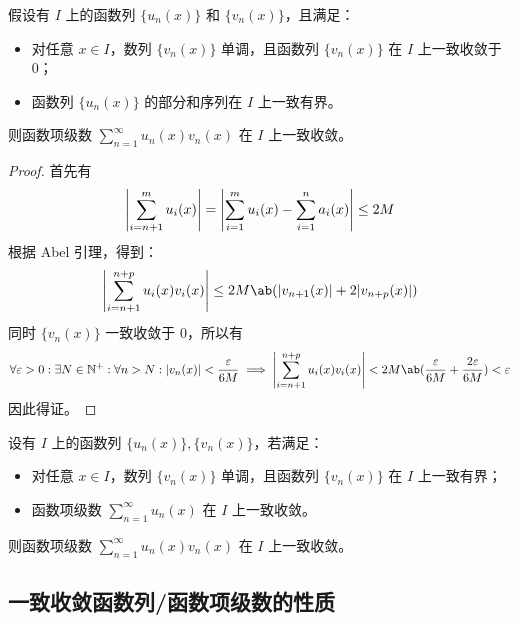 \begin{theorem}
    假设有 $I$ 上的函数列 $\{u_n(x)\}$ 和 $\{v_n(x)\}$，且满足：
    \begin{itemize}
        \item 对任意 $x \in I$，数列 $\{v_n(x)\}$ 单调，且函数列 $\{v_n(x)\}$ 在 $I$ 上一致收敛于 $0$；
        \item 函数列 $\{u_n(x)\}$ 的部分和序列在 $I$ 上一致有界。
    \end{itemize}
    则函数项级数 $\sum\limits_{n = 1}^{\infty} u_n(x) v_n(x)$ 在 $I$ 上一致收敛。

    \begin{proof}
        首先有
        $$
        \abs{\sum_{i = n + 1}^{m} u_i(x)} = \abs{\sum_{i = 1}^{m} u_i(x) - \sum_{i = 1}^{n} a_i(x)} \le 2M
        $$
        根据 Abel 引理，得到：
        $$
        \abs{\sum_{i = n + 1}^{n + p} u_i(x) v_i(x)} \le 2 M \ab(\abs{v_{n + 1}(x)} + 2 \abs{v_{n + p}(x)})
        $$
        同时 $\{v_n(x)\}$ 一致收敛于 $0$，所以有
        $$
        \forall\varepsilon > 0: \exists N \in \mathbb{N}^{+}: \forall n > N: \abs{v_n(x)} < \frac{\varepsilon}{6 M} \implies \abs{\sum_{i = n + 1}^{n + p} u_i(x) v_i(x)} < 2M \ab(\frac{\varepsilon}{6M} + \frac{2 \varepsilon}{6M}) < \varepsilon
        $$
        因此得证。
    \end{proof}
\end{theorem}

\begin{theorem}
    设有 $I$ 上的函数列 $\{u_n(x)\}, \{v_n(x)\}$，若满足：
    \begin{itemize}
        \item 对任意 $x \in I$，数列 $\{v_n(x)\}$ 单调，且函数列 $\{v_n(x)\}$ 在 $I$ 上一致有界；
        \item 函数项级数 $\sum\limits_{n = 1}^{\infty} u_n(x)$ 在 $I$ 上一致收敛。
    \end{itemize}
    则函数项级数 $\sum\limits_{n = 1}^{\infty} u_n(x) v_n(x)$ 在 $I$ 上一致收敛。
\end{theorem}

\subsection{一致收敛函数列/函数项级数的性质}

